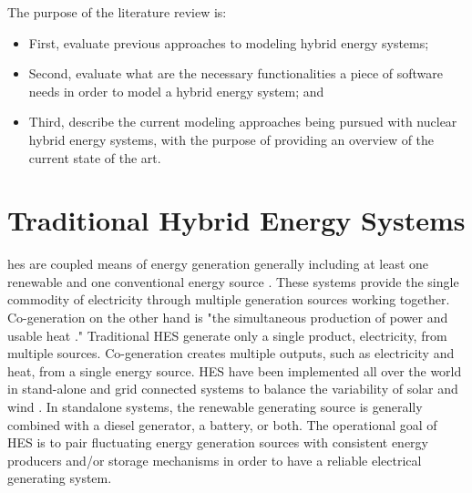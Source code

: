 \documentclass[12pt]{UIdahoMastersThesis}
\begin{document}
The purpose of the literature review is:
\begin{itemize}
\item First, evaluate previous approaches to modeling hybrid energy systems;
\item Second, evaluate what are the necessary functionalities a piece of software needs in order to model a hybrid energy system; and
\item Third, describe the current modeling approaches being pursued with nuclear hybrid energy systems, with the purpose of providing an overview of the current state of the art.
\end{itemize}
	 

\section{Traditional Hybrid Energy Systems}
\ac{hes} are coupled means of energy generation generally including at least one renewable and one conventional energy source \cite {Ibrahim2011}. These systems provide the single commodity of electricity through multiple generation sources working together. Co-generation on the other hand is "the simultaneous production of power and usable heat \cite{Rosen2005}." Traditional HES generate only a single product, electricity, from multiple sources. Co-generation creates multiple outputs, such as electricity and heat, from a single energy source. HES have been implemented all over the world in stand-alone and grid connected systems to balance the variability of solar and wind \cite {Garcia2015, Qi2014, Shin2015, Nixon2012, Adaramola2014, Goodbody2013, BorgesNeto2010, McGowan1996}. In standalone systems, the renewable generating source is generally combined with a diesel generator, a battery, or both. The operational goal of HES is to pair fluctuating energy generation sources with consistent energy producers and/or storage mechanisms in order to have a reliable electrical generating system. 
\end{document}
